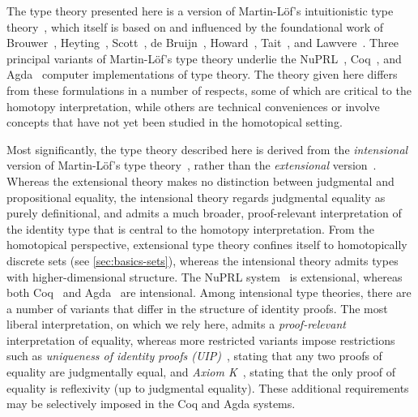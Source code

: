 \sectionNotes

The type theory presented here is a version of Martin-L\"{o}f's intuitionistic type theory~\cite{martinlof71itt,Martin-Lof-1972,Martin-Lof-1973,Martin-Lof-1979,martin-lof:bibliopolis}, which itself is based on and influenced by the foundational work of Brouwer~\cite{beeson}, Heyting~\cite{heyting1966intuitionism}, Scott~\cite{scott70}, de Bruijn~\cite{deBruijn-1973}, Howard~\cite{howard:pat}, Tait~\cite{Tait-1966,Tait-1968}, and Lawvere~\cite{lawvere}.  Three principal variants of Martin-L\"{o}f's type theory underlie the NuPRL~\cite{constable+86nuprl-book}, Coq~\cite{Coq}, and Agda~\cite{norell2007towards} computer implementations of type theory.  The theory given here differs from these formulations in a number of respects, some of which are critical to the homotopy interpretation, while others are technical conveniences or involve concepts that have not yet been studied in the homotopical setting.

Most significantly, the type theory described here is derived from the \emph{intensional} version of Martin-L\"{o}f's type theory~\cite{Martin-Lof-1973}, rather than the \emph{extensional} version~\cite{Martin-Lof-1979}.  Whereas the extensional theory makes no distinction between judgmental and propositional equality, the intensional theory regards judgmental equality as purely definitional, and admits a much broader, proof-relevant interpretation of the identity type that is central to the homotopy interpretation.  From the homotopical perspective, extensional type theory confines itself to homotopically discrete sets (see \autoref{sec:basics-sets}), whereas the intensional theory admits types with higher-dimensional structure.  The NuPRL system~\cite{constable+86nuprl-book} is extensional, whereas both Coq~\cite{Coq} and Agda~\cite{norell2007towards} are intensional.  Among intensional type theories, there are a number of variants that differ in the structure of identity proofs.  The most liberal interpretation, on which we rely here, admits a \emph{proof-relevant} interpretation of equality, whereas more restricted variants impose restrictions such as \emph{uniqueness of identity proofs (UIP)}~\cite{StreicherK}, stating that any two proofs of equality are judgmentally equal, and \emph{Axiom K}~\cite{StreicherK}, stating that the only proof of equality is reflexivity (up to judgmental equality).  These additional requirements may be selectively imposed in the Coq and Agda systems.


